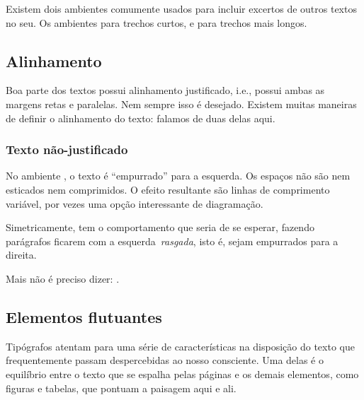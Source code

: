 Existem dois ambientes comumente usados para incluir excertos de
outros textos no seu. Os ambientes  para trechos
curtos, e  para trechos mais longos.

\subsection{Alinhamento}\label{sec:alinhamento}

Boa parte dos textos possui alinhamento justificado, i.e., possui
ambas as margens retas e paralelas. Nem sempre isso é
desejado. Existem muitas maneiras de definir o alinhamento do texto:
falamos de duas delas aqui.

\subsubsection{Texto não-justificado}

\begin{flushleft}
No ambiente
%
%
, o texto é
``empurrado'' para a esquerda. Os espaços não são nem esticados nem
comprimidos. O efeito resultante são linhas de comprimento variável, 
 por vezes uma opção interessante de diagramação.
\end{flushleft}

\begin{flushright}
Simetricamente,
%
%
 tem o
comportamento que seria de se esperar, fazendo  parágrafos  ficarem
com a esquerda~\emph{rasgada}, isto é, sejam empurrados para a
direita. 
\end{flushright}

\begin{center}
Mais não é preciso dizer: .
\end{center}

\subsection{Elementos
  flutuantes}\label{sec:floats}

Tipógrafos atentam para uma série de características na disposição do
texto que frequentemente passam despercebidas ao nosso consciente. Uma
delas é o equilíbrio entre o texto que se espalha pelas páginas e os
demais elementos, como figuras e tabelas, que pontuam a paisagem aqui
e ali. 

